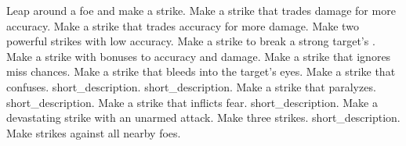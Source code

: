 \begin{spelllist}
 Leap around a foe and make a strike.
 Make a strike that trades damage for more accuracy.
 Make a strike that trades accuracy for more damage.
 Make two powerful strikes with low accuracy.
 Make a strike to break a strong target's .
 Make a strike with bonuses to accuracy and damage.
 Make a strike that ignores miss chances.
 Make a strike that bleeds into the target's eyes.
 Make a strike that confuses.
 short_description.
 short_description.
 Make a strike that paralyzes.
 short_description.
 Make a strike that inflicts fear.
 short_description.
 Make a devastating strike with an unarmed attack.
 Make three strikes.
 short_description.
 Make strikes against all nearby foes.
\end{spelllist}



\small
